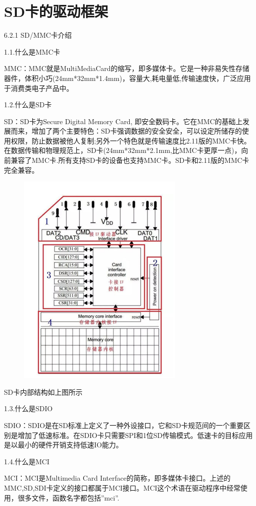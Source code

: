 \section{SD卡的驱动框架}
6.2.1 SD/MMC卡介绍

1.1.什么是MMC卡

MMC：MMC就是MultiMediaCard的缩写，即多媒体卡。它是一种非易失性存储器件，体积小巧(24mm*32mm*1.4mm)，容量大,耗电量低,传输速度快，广泛应用于消费类电子产品中。

1.2.什么是SD卡

SD：SD卡为Secure Digital Memory Card, 即安全数码卡。它在MMC的基础上发展而来，增加了两个主要特色：SD卡强调数据的安全安全，可以设定所储存的使用权限，防止数据被他人复制;另外一个特色就是传输速度比2.11版的MMC卡快。在数据传输和物理规范上，SD卡(24mm*32mm*2.1mm,比MMC卡更厚一点)，向前兼容了MMC卡.所有支持SD卡的设备也支持MMC卡。SD卡和2.11版的MMC卡完全兼容。
\begin{figure}[H]
    \centering
    \includegraphics{figures/06-02-SD.png}
\end{figure}

SD卡内部结构如上图所示

1.3.什么是SDIO

SDIO：SDIO是在SD标准上定义了一种外设接口，它和SD卡规范间的一个重要区别是增加了低速标准。在SDIO卡只需要SPI和1位SD传输模式。低速卡的目标应用是以最小的硬件开销支持低速IO能力。

1.4.什么是MCI

MCI：MCI是Multimedia Card Interface的简称，即多媒体卡接口。上述的MMC,SD,SDI卡定义的接口都属于MCI接口。MCI这个术语在驱动程序中经常使用，很多文件，函数名字都包括”mci”.

